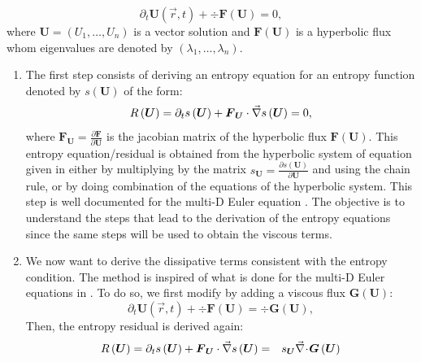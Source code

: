 %
\begin{equation}\label{eq:hyp_syst_sct1b}
\partial_t \boldsymbol{U}(\vec{r},t) + \div \boldsymbol{F} \left( \boldsymbol{U} \right) = 0,
\end{equation}
%
where $\boldsymbol{U} = \left( U_1, \dots, U_n \right)$ is a vector solution and $\boldsymbol{F} \left( \boldsymbol{U} \right)$ is a hyperbolic flux whom eigenvalues are denoted by $\left( \lambda_1, \dots, \lambda_n \right)$.
\begin{enumerate}
\item The first step consists of deriving an entropy equation for an entropy function denoted by $s\left(\boldsymbol{U}\right)$ of the form: 
%
\begin{equation}
R\left(\boldsymbol{U}\right) = \partial_t s\left(\boldsymbol{U}\right) + \boldsymbol{F}_{\boldsymbol{U}} \cdot \vec{\nabla} s \left(\boldsymbol{U}\right) = 0,
\end{equation}
%
where $\boldsymbol{F}_{\boldsymbol{U}} = \frac{\partial \boldsymbol{F}}{\partial \boldsymbol{U}}$ is the jacobian matrix of the hyperbolic flux $\boldsymbol{F} \left( \boldsymbol{U} \right)$.
This entropy equation/residual is obtained from the hyperbolic system of equation given in  either by multiplying by the matrix $s_{\boldsymbol{U}} = \frac{\partial s (\boldsymbol{U})}{\partial \boldsymbol{U}}$ and using the chain rule, or by doing combination of the equations of the hyperbolic system. This step is well documented for the multi-D Euler equation \cite{Toro}. The objective is to understand the steps that lead to the derivation of the entropy equations since the same steps will be used to obtain the viscous terms.
\item We now want to derive the dissipative terms consistent with the entropy condition. The method is inspired of what is done for the multi-D Euler equations in \cite{jlg}. To do so, we first modify  by adding a viscous flux $\boldsymbol{G} \left( \boldsymbol{U} \right)$:
%
\begin{equation}\label{eq:hyp_syst2_sct1b}
\partial_t \boldsymbol{U}(\vec{r},t) + \div \boldsymbol{F} \left( \boldsymbol{U} \right) = \div \boldsymbol{G} \left( \boldsymbol{U} \right),
\end{equation}
%
Then, the entropy residual is derived again:
%
\begin{eqnarray}\label{eq:hyp_syst3_sct1b}
R\left(\boldsymbol{U}\right) = \partial_t s\left(\boldsymbol{U}\right) + \boldsymbol{F}_{\boldsymbol{U}} \cdot \grad s \left(\boldsymbol{U}\right) &=& s_{\boldsymbol{U}} \div \boldsymbol{G} \left( \boldsymbol{U} \right) \nonumber \\

\end{eqnarray}
\end{enumerate}
